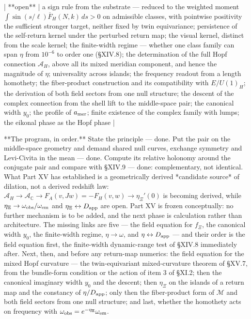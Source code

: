 | **open** | a sign rule from the substrate — reduced to the weighted moment $\int\sin(s/\ell)\bar F_H(N,k)\,ds>0$ on admissible classes, with pointwise positivity the sufficient stronger target, neither fixed by twin equivariance; persistence of the self-return kernel under the perturbed return map; the visual kernel, distinct from the scale kernel; the finite-width regime — whether one class family can span $\eta$ from $10^{-6}$ to order one (§XIV.8); the determination of the full Hopf connection $\mathcal A_H$, above all its mixed meridian component, and hence the magnitude of $\eta$; universality across islands; the frequency readout from a length homothety; the fiber-product construction and its compatibility with $E/U(1)_H$; the derivation of both field sectors from one null structure; the descent of the complex connection from the shell lift to the middle-space pair; the canonical width $y_0$; the profile of $a_{\rm mer}$; finite existence of the complex family with lumps; the eikonal phase as the Hopf phase |

**The program, in order.** State the principle — done. Put the pair on the middle-space geometry and demand shared null curves, exchange symmetry and Levi-Civita in the mean — done. Compute its relative holonomy around the conjugate pair and compare with §XIV.9 — done: complementary, not identical. What Part XV has established is a geometrically derived *candidate source* of dilation, not a derived redshift law: $\mathcal A_H\to\mathcal A_{\mathbb C}\to F_A(v,Jw) = -F_H(v,w)\to\eta_\Xi'(0)$ is becoming derived, while $\eta_\Xi\to\omega_{\rm obs}/\omega_{\rm em}$ and $\eta_\Xi\leftrightarrow D_{\rm app}$ are open. Part XV is frozen conceptually: no further mechanism is to be added, and the next phase is calculation rather than architecture. The missing links are five — the field equation for $f_\Xi$, the canonical width $y_0$, the finite-width regime, $\eta\to\omega$, and $\eta\leftrightarrow D_{\rm app}$ — and their order is the field equation first, the finite-width dynamic-range test of §XIV.8 immediately after. Next, then, and before any return-map numerics: the field equation for the mixed Hopf curvature — the twin-equivariant mixed-curvature theorem of §XV.7, from the bundle-form condition or the action of item 3 of §XI.2; then the canonical imaginary width $y_0$ and the descent; then $\eta_\Xi$ on the islands of a return map and the constancy of $\eta/D_{\rm app}$; only then the fiber-product form of $\mathcal M$ and both field sectors from one null structure; and last, whether the homothety acts on frequency with $\omega_{\rm obs} = e^{-\eta_\Xi}\omega_{\rm em}$.

